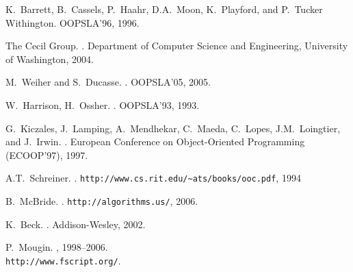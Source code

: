 \documentclass[preprint,10pt]{sigplanconf}
\begin{document}
\begin{thebibliography}{10}
K.~Barrett, B.~Cassels, P.~Haahr, D.A.~Moon, K.~Playford, and P.~Tucker Withington.
\newblock OOPSLA'96, 1996.

The Cecil Group.
.
\newblock Department of Computer Science and Engineering, University of Washington, 2004.

M.~Weiher and S.~Ducasse.
.
\newblock OOPSLA'05, 2005.

W.~Harrison, H.~Ossher.
.
\newblock OOPSLA'93, 1993.

G.~Kiczales, J.~Lamping, A.~Mendhekar, C.~Maeda, C.~Lopes, J.M.~Loingtier, and J.~Irwin.
.
\newblock European Conference on Object-Oriented Programming (ECOOP'97), 1997.

A.T.~Schreiner.
.
\newblock
\verb!http://www.cs.rit.edu/~ats/books/ooc.pdf!, 1994


B.~McBride.
.
\newblock \verb!http://algorithms.us/!, 2006.





K.~Beck.
.
\newblock Addison-Wesley, 2002.



P.~Mougin.
, 1998--2006. \\
\newblock \verb!http://www.fscript.org/!.



\end{thebibliography}
\end{document}
